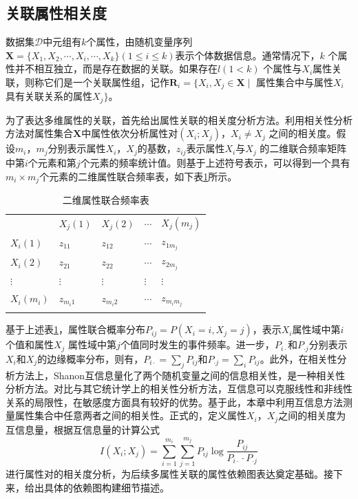 \subsection{关联属性相关度}\label{sec:correlation_inditifity}
数据集$\mathcal{D}$中元组有$k$个属性，由随机变量序列$\bm{X}=\{X_1,X_2,\cdots,X_i,\cdots,X_k\}(1 \leq i \leq k)$表示个体数据信息。通常情况下，$k$ 个属性并不相互独立，而是存在数据的关联。如果存在$l(1 <k)$ 个属性与$X_i$属性关联，则称它们是一个关联属性组，记作$\bm{R}_i=\{X_i,X_j \in \bm{X}\mid$ 属性集合中与属性$X_i$具有关联关系的属性$X_j\}$。

为了表达多维属性的关联，首先给出属性关联的相关度分析方法。利用相关性分析方法对属性集合$\bm{X}$中属性依次分析属性对$(X_i;X_j)$，$X_i \neq X_j$ 之间的相关度。假设$m_i$，$m_j$分别表示属性$X_i$，$X_j$的基数，$z_{ij}$表示属性$X_i$与$X_j$ 的二维联合频率矩阵中第$i$个元素和第$j$个元素的频率统计值。则基于上述符号表示，可以得到一个具有$m_i \times m_j$个元素的二维属性联合频率表，如下表\ref{tab:table_frquence_4.1}所示。

\begin{table}[htb]
\small
\centering
\caption{二维属性联合频率表}
\label{tab:table_frquence_4.1}
\begin{tabular}{p{2cm}p{2cm}p{2cm}p{2cm}p{2cm}}
\hline\noalign{\smallskip}
&$X_j(1)$  &$X_j(2)$ &$\cdots$ & $X_j(m_j)$\\
\noalign{\smallskip}\hline\noalign{\smallskip}
$X_i(1)$ & $z_{11}$ & $z_{12}$ & $\cdots$ & $z_{1m_j}$\\
$X_i(2)$ & $z_{21}$ & $z_{22}$ & $\cdots$ & $z_{2m_j}$\\
$\vdots$ & $\vdots$ & $\vdots$ & $\vdots$ & $\vdots$\\
$X_i(m_i)$ & $z_{m_i1}$ & $z_{m_i2}$ & $\cdots$ & $z_{m_im_j}$\\
\noalign{\smallskip}\hline
\end{tabular}
\end{table}

基于上述表\ref{tab:table_frquence_4.1}，属性联合概率分布$P_{ij}=P(X_i=i,X_j=j)$，表示$X_i$属性域中第$i$个值和属性$X_j$ 属性域中第$j$个值同时发生的事件频率。进一步，$P_{i\cdot}$和$P_{\cdot j}$分别表示$X_i$和$X_j$的边缘概率分布，则有，$P_{i\cdot}=\sum_{j}P_{ij}$和$P_{\cdot j}=\sum_{i}P_{ij}$。此外，在相关性分析方法上，Shanon互信息量化了两个随机变量之间的信息相关性，是一种相关性分析方法。对比与其它统计学上的相关性分析方法，互信息可以克服线性和非线性关系的局限性\cite{liangjy2016,reshef2011detecting}，在敏感度方面具有较好的优势。基于此，本章中利用互信息方法测量属性集合中任意两者之间的相关性。正式的，定义属性$X_i$，$X_j$之间的相关度为互信息量，根据互信息量的计算公式
\begin{equation}\label{eq:mi_correlation}
	I(X_i;X_j)=\sum_{i=1}^{m_i}\sum_{j=1}^{m_j}P_{ij}\log \frac{P_{ij}}{P_{i \cdot}\cdot P_{\cdot j}}
\end{equation}
进行属性对的相关度分析，为后续多属性关联的属性依赖图表达奠定基础。接下来，给出具体的依赖图构建细节描述。
